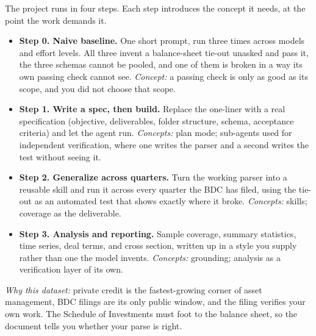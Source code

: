 \documentclass[11pt]{article}
\begin{document}
The project runs in four steps. Each step introduces the concept it needs, at the point the work demands it.
\begin{itemize}
  \item \textbf{Step 0. Naive baseline.} One short prompt, run three times across models and effort levels. All three invent a balance-sheet tie-out unasked and pass it, the three schemas cannot be pooled, and one of them is broken in a way its own passing check cannot see. \emph{Concept:} a passing check is only as good as its scope, and you did not choose that scope.
  \item \textbf{Step 1. Write a spec, then build.} Replace the one-liner with a real specification (objective, deliverables, folder structure, schema, acceptance criteria) and let the agent run. \emph{Concepts:} plan mode; sub-agents used for independent verification, where one writes the parser and a second writes the test without seeing it.
  \item \textbf{Step 2. Generalize across quarters.} Turn the working parser into a reusable skill and run it across every quarter the BDC has filed, using the tie-out as an automated test that shows exactly where it broke. \emph{Concepts:} skills; coverage as the deliverable.
  \item \textbf{Step 3. Analysis and reporting.} Sample coverage, summary statistics, time series, deal terms, and cross section, written up in a style you supply rather than one the model invents. \emph{Concepts:} grounding; analysis as a verification layer of its own.
\end{itemize}
\emph{Why this dataset:} private credit is the fastest-growing corner of asset management, BDC filings are its only public window, and the filing verifies your own work. The Schedule of Investments must foot to the balance sheet, so the document tells you whether your parse is right.
\end{document}
